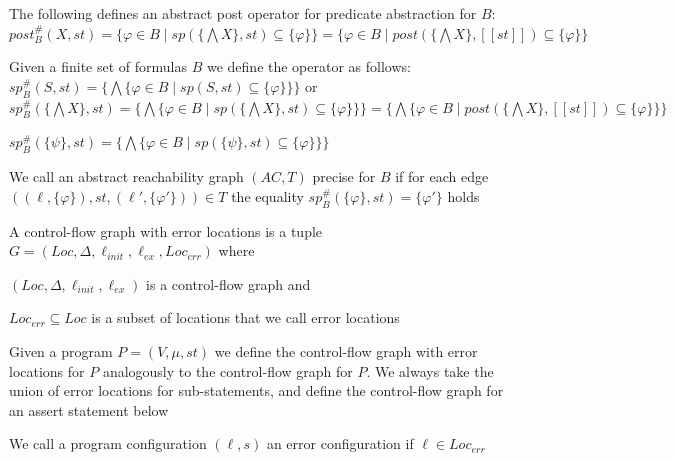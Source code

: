 \documentclass[landscape, a4paper]{article}
\begin{document}
\begin{minipage}[t]{0.2\linewidth}
\begin{betterlist}
		\item \color{violet}The following defines an \alert{abstract post operator} for predicate abstraction for $B$: $post^\#_B(X, st) = \{\varphi \in B \mid sp(\{\bigwedge X\}, st) \subseteq \{\varphi\}\} = \{\varphi \in B \mid post(\{\bigwedge X\}, [[st]]) \subseteq \{\varphi\}\}$\color{black}
		\item \color{orange}Given a finite set of formulas $B$ we define the  operator as follows: $sp^\#_B(S, st) = \{\bigwedge \{\varphi \in B \mid sp(S, st) \subseteq \{\varphi\}\}\}$ or $sp^\#_B(\{\bigwedge X\}, st) = \{\bigwedge \{\varphi \in B \mid sp(\{\bigwedge X\}, st) \subseteq \{\varphi\}\}\} = \{\bigwedge \{\varphi \in B \mid post(\{\bigwedge X\}, [[st]]) \subseteq \{\varphi\}\}\}$\color{black}
		\begin{betterlist}
			\item $sp^\#_B(\{ \psi \} , st) = \{\bigwedge \{\varphi \in B \mid sp(\{ \psi \}, st) \subseteq \{ \varphi \}\}\}$
		\end{betterlist}
		\item We call an abstract reachability graph $(AC, T)$ \alert{precise for $B$} if for each edge $((\ell, \{\varphi\}), st, (\ell', \{\varphi'\})) \in T$ the equality $sp^\#_B(\{\varphi\}, st) = \{\varphi'\}$ holds
	\end{betterlist}
	\begin{betterlist}
		\item \color{orange}A \alert{control-flow graph with error locations} is a tuple $G = (Loc, \Delta, \ell_{init}, \ell_{ex}, Loc_{err})$ where
		\begin{betterlist}
			\item $(Loc, \Delta, \ell_{init}, \ell_{ex})$ is a control-flow graph and
			\item $Loc_{err} \subseteq Loc$ is a subset of locations that we call \alert{error locations}
		\end{betterlist}\color{black}
		\item Given a program $P = (V, \mu, st)$ we define the \alert{control-flow graph with error locations for $P$} analogously to the control-flow graph for $P$. We always take the union of error locations for sub-statements, and define the control-flow graph for an assert statement below
		\begin{betterlist}
			\item {}
		\end{betterlist}
		\item \color{orange}We call a program configuration $(\ell, s)$ an \alert{error configuration} if $\ell \in Loc_{err}$\color{black}

\end{betterlist}
\end{minipage}
\end{document}
